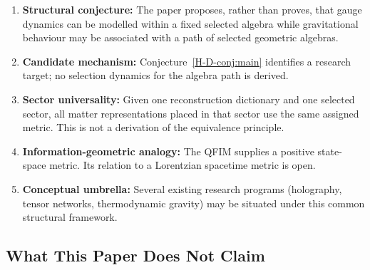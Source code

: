 \documentclass[12pt,a4paper,openany]{book}
\begin{document}
\begin{enumerate}
    \item \textbf{Structural conjecture:} The paper proposes, rather than proves, that gauge dynamics can be modelled within a fixed selected algebra while gravitational behaviour may be associated with a path of selected geometric algebras.
    
    \item \textbf{Candidate mechanism:} Conjecture~\ref{H-D-conj:main} identifies a research target; no selection dynamics for the algebra path is derived.
    
    \item \textbf{Sector universality:} Given one reconstruction dictionary and one selected sector, all matter representations placed in that sector use the same assigned metric.  This is not a derivation of the equivalence principle.
    
    \item \textbf{Information-geometric analogy:} The QFIM supplies a positive state-space metric.  Its relation to a Lorentzian spacetime metric is open.
    
    \item \textbf{Conceptual umbrella:} Several existing research programs (holography, tensor networks, thermodynamic gravity) may be situated under this common structural framework.
\end{enumerate}

\subsection{What This Paper Does Not Claim}
\end{document}
